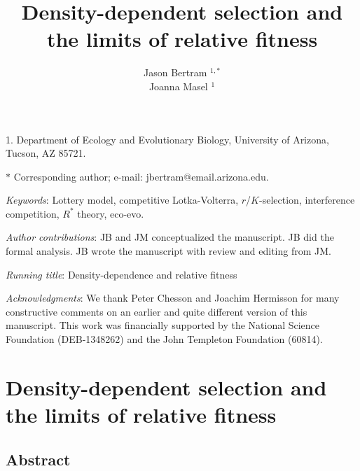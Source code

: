 \documentclass[12pt]{article}
\title{Density-dependent selection and the limits of relative fitness}
\author{Jason Bertram $^{1,\ast}$ \\ 
Joanna Masel $^{1}$}
\date{}
\begin{document}
\maketitle

\noindent{}1. Department of Ecology and Evolutionary Biology, University of Arizona, Tucson, AZ 85721.

\noindent{}$\ast$ Corresponding author; e-mail: jbertram@email.arizona.edu.

\bigskip

\textit{Keywords}: Lottery model, competitive Lotka-Volterra, $r$/$K$-selection, interference competition, $R^*$ theory, eco-evo.

\bigskip

\textit{Author contributions}: JB and JM conceptualized the manuscript. JB did the formal analysis. JB wrote the manuscript with review and editing from JM. 

\bigskip

\textit{Running title}: Density-dependence and relative fitness

\bigskip

\textit{Acknowledgments}: We thank Peter Chesson and Joachim Hermisson for many constructive comments on an earlier and quite different version of this manuscript. This work was financially supported by the National Science Foundation (DEB-1348262) and the John Templeton Foundation (60814).

\linenumbers{}
\modulolinenumbers[1]

\newpage{}


\section*{\centering \huge  Density-dependent selection and the limits of relative fitness}

\bigskip

\subsection*{Abstract}
\end{document}

